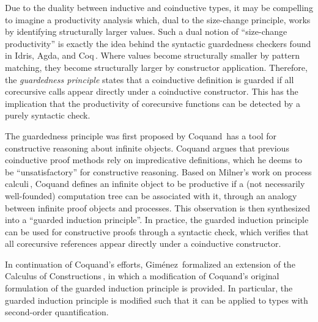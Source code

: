Due to the duality between inductive and coinductive types, it may be compelling to imagine a productivity analysis which, dual to the size-change principle, works by identifying structurally larger values. Such a dual notion of ``size-change productivity'' is exactly the idea behind the syntactic guardedness checkers found in Idris, Agda, and Coq\,\citep{Coq:manual}. Where values become structurally smaller by pattern matching, they become structurally larger by constructor application. Therefore, the \emph{guardedness principle} states that a coinductive definition is guarded if all corecursive calls appear directly under a coinductive constructor. This has the implication that the productivity of corecursive functions can be detected by a purely syntactic check.

The guardedness principle was first proposed by Coquand\,\citep{Coquand94} has a tool for constructive reasoning about infinite objects. Coquand argues that previous coinductive proof methods rely on impredicative definitions, which he deems to be ``unsatisfactory'' for constructive reasoning. Based on Milner's work on process calculi\,\citep{Milner:1989}, Coquand defines an infinite object to be productive if a (not necessarily well-founded) computation tree can be associated with it, through an analogy between infinite proof objects and processes. This observation is then synthesized into a ``guarded induction principle''. In practice, the guarded induction principle can be used for constructive proofs through a syntactic check, which verifies that all corecursive references appear directly under a coinductive constructor.

In continuation of Coquand's efforts, Gim\'{e}nez\,\citep{Gimenez95} formalized an extension of the Calculus of Constructions\,\citep{Coquand:1988}, in which a modification of Coquand's original formulation of the guarded induction principle is provided. In particular, the guarded induction principle is modified such that it can be applied to types with second-order quantification.

